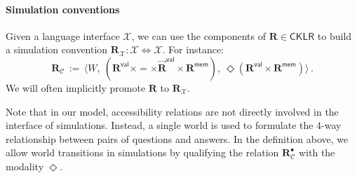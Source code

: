\documentclass[sigplan,screen,review]{acmart}
\newcommand{\kw}[1]{\ensuremath{ \mathsf{#1} }}
\newcommand{\ans}{\bullet}
\newcommand{\vref}{\le_\kw{v}}
\newcommand{\mext}{\le_\kw{m}}
\newcommand{\pshift}{1.6ex}
\newcommand{\pcdist}{2.5}
\newcommand{\pcangle}{60}
\newcommand{\ph}[1]{%
  \tikz[remember picture]{\coordinate (#1);}}
\newcommand{\ptc}[2]{%
  \rule{0pt}{1.4em}%
  \tikz[remember picture, overlay]{
    \draw[->,#2]
      let \p{dest} = (#1),
          \n1 = {ln(veclen(\x{dest}, \y{dest}) + 1)},
          \p1 = ($(0,0)+(0,\pshift)$),
          \p4 = ($(#1)+(0,\pshift)$),
          \p2 = ($(\p1)!\n1*\pcdist!-\pcangle:(\p4)$),
          \p3 = ($(\p4)!\n1*\pcdist!+\pcangle:(\p1)$) in
        (\p1) .. controls (\p2) and (\p3) .. (\p4);}}
\newcommand{\bpt}[1]{%
  \ptc{#1}{black}}
\begin{document}

\paragraph{Simulation conventions} %

Given a language interface $\mathcal{X}$,
we can use the components of
$\mathbf{R} \in \kw{CKLR}$
to build a simulation convention
$\mathbf{R}_\mathcal{X} : \mathcal{X} \Leftrightarrow \mathcal{X}$.
For instance:
\[
  \mathbf{R}_\mathcal{C} \, := \,
    \big\langle
      W, \:
      (\mathbf{R}^\kw{val} \times {=} \times
       \vec{\mathbf{R}}^\kw{val} \times \mathbf{R}^\kw{mem}), \:
      \Diamond (\mathbf{R}^\kw{val} \times \mathbf{R}^\kw{mem})
    \big\rangle \,.
\]
We will often implicitly promote $\mathbf{R}$ to $\mathbf{R}_\mathcal{X}$.

Note that in our model,
accessibility relations are not directly involved
in the interface of simulations.
Instead,
a single world is used to formulate
the 4-way relationship between
pairs of questions and answers.
In the definition above,
we allow world transitions in simulations
by qualifying the relation $\mathbf{R}_\mathcal{C}^\ans$
with the modality $\Diamond$.

\end{document}
